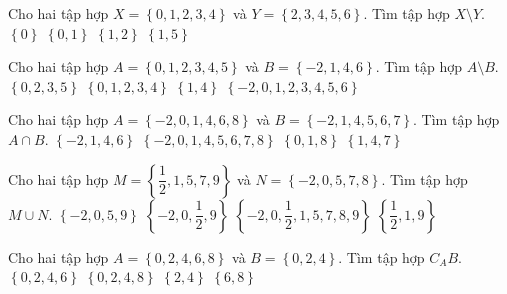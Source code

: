 \begin{ex}%
	Cho hai tập hợp $X=\left\{0, 1, 2, 3, 4\right\}$ và $Y=\left\{ 2, 3, 4, 5, 6 \right\}$. Tìm tập hợp $X\setminus Y$.
	\choice
	{$\left\{ 0 \right\}$}
	{\True $\left\{ 0, 1 \right\}$}
	{$\left\{ 1, 2 \right\}$}
	{$\left\{ 1, 5 \right\}$}
\end{ex}
\begin{ex}%
	Cho hai tập hợp $A = \left\{ 0, 1, 2,  3, 4, 5 \right\}$ và $B = \left\{-2, 1, 4, 6\right \}$. Tìm tập hợp $A \setminus B$.
	\choice
	{\True $\left\{0, 2, 3, 5\right\}$}
	{$\left\{0, 1, 2, 3, 4\right\}$}
	{$\left\{1, 4\right\} $}
	{$\left\{-2, 0, 1, 2, 3, 4, 5, 6\right\}$}
\end{ex}

\begin{ex}%
	Cho hai tập hợp $A = \left\{ -2, 0, 1, 4, 6, 8 \right\}$ và $B =\left\{-2, 1, 4, 5, 6, 7\right \}$. Tìm tập hợp $A \cap B$.
	\choice
	{\True $\left\{ -2, 1, 4, 6\right\}$}
	{$\left\{-2, 0, 1, 4, 5, 6, 7, 8\right\}$}
	{$\left\{0, 1, 8\right\}$}
	{$\left\{1, 4, 7\right\}$}
\end{ex}

\begin{ex}%
	Cho hai tập hợp $M = \left\{ \dfrac{1}{2}, 1, 5, 7, 9 \right\}$ và $N =\left\{-2, 0, 5, 7, 8\right \}$. Tìm tập hợp $M \cup N$.
	\choice
	{$\left\{ -2, 0, 5, 9\right\}$}
	{$\left\{-2, 0, \dfrac{1}{2}, 9\right\}$}
	{\True  $\left\{-2, 0, \dfrac{1}{2}, 1, 5, 7, 8, 9\right\} $}
	{$\left\{\dfrac{1}{2}, 1, 9\right\}$}
\end{ex}

\begin{ex}%
	Cho hai tập hợp $A = \left\{0, 2, 4, 6, 8\right\}$ và $B = \left\{0, 2, 4\right\}$. Tìm tập hợp $C_{A}B$.
	\choice
	{$\left\{0, 2, 4, 6\right\}$}
	{$\left\{0, 2, 4, 8\right\}$}
	{$\left\{2, 4\right\}$}
	{\True $\left\{6, 8\right\}$}
\end{ex}

